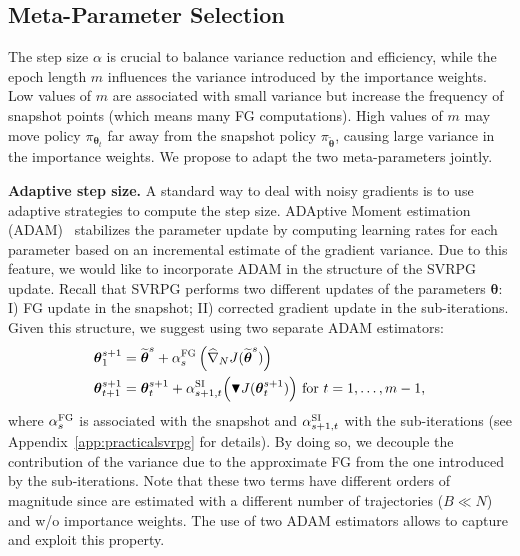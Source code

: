 \documentclass{article}
\theoremstyle{remark}
\theoremstyle{definition}
\newcommand{\vtheta}{\boldsymbol{\theta}}
\newcommand{\wt}[1]{\widetilde{#1}}
\newcommand{\wh}[1]{\widehat{#1}}
\begin{document}
\subsection{Meta-Parameter Selection}\label{sec:stopping}
The step size $\alpha$ is crucial to balance variance reduction and efficiency, while
the epoch length $m$ influences the variance introduced by the importance weights. Low values of $m$ are associated with small variance but increase the frequency of snapshot points (which means many FG computations). High values of $m$ may move policy $\pi_{\vtheta_t}$ far away from the snapshot policy $\pi_{\wt{\vtheta}}$, causing large variance in the importance weights. We propose to adapt the two meta-parameters jointly.

\textbf{Adaptive step size.}
A standard way to deal with noisy gradients is to use adaptive strategies to compute the step size.
ADAptive Moment estimation (ADAM)~\citep{kingma2014adam} stabilizes the parameter update by computing learning rates for each parameter based on an incremental estimate of the gradient variance.
Due to this feature, we would like to incorporate ADAM in the structure of the SVRPG update.
Recall that SVRPG performs two different updates of the parameters $\vtheta$: I) FG update in the snapshot; II) corrected gradient update in the sub-iterations.
Given this structure, we suggest using two separate ADAM estimators:
\begin{align*}
        \vtheta^{s+1}_1 &= \wt{\vtheta}^s + \alpha^{\textsc{FG}}_s\left(\wh{\nabla}_N J(\wt{\vtheta}^s) \right)\\
        \vtheta^{s+1}_{t+1} &= \vtheta^{s+1}_t + \alpha^{\textsc{SI}}_{s+1,t} \Big( 
        \blacktriangledown J(\vtheta^{s+1}_t)\Big)
        \text{ for $t=1,\dots,m-1$},
\end{align*}
where $\alpha^{\textsc{FG}}_{s}$ is associated with the snapshot and $\alpha^{\textsc{SI}}_{s+1,t}$ with the sub-iterations (see Appendix~\ref{app:practicalsvrpg} for details).
By doing so, we decouple the contribution of the variance due to the approximate FG from the one introduced by the sub-iterations.
Note that these two terms have different orders of magnitude since are estimated with a different number of trajectories ($B \ll N$) and w/o importance weights.
The use of two ADAM estimators allows to capture and exploit this property.
\end{document}
